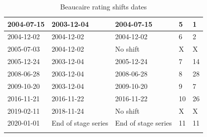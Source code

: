 \documentclass[11pt]{article}
\begin{document}
\begin{center}
\begin{table}[h!]
\begin{tabular}{|m{3cm}|m{3cm}|m{3cm}|m{2cm}|m{2cm}|}
                \hline
                2004-07-15     &       2003-12-04  &   2004-07-15   & 5 & 1 \\
                \hline
                2004-12-02     &       2004-12-02  &   2004-12-02   & 6 & 2 \\
                \hline
                2005-07-03     &       2004-12-02  &   No shift  & X & X \\
                \hline
                2005-12-24     &       2003-12-04  &   2005-12-24  & 7 & 14 \\
                \hline
                2008-06-28     &       2003-12-04  &   2008-06-28    & 8 & 28 \\
                \hline
                2009-10-20     &       2003-12-04  &   2009-10-20   & 9 & 7 \\
                \hline
                2016-11-21     &       2016-11-22  &   2016-11-22  & 10 & 26 \\
                \hline
                2019-02-11     &       2018-11-24  &   No shift   & X & X \\
                \hline
                2020-01-01     &      End of stage series  &   End of stage series  & 11 & 11\\
                \lasthline
            \end{tabular}
            
            \caption{Beaucaire rating shifts dates}
            \label{tab:ShiftDates}
        \end{table}
    \end{center}
\end{document}
